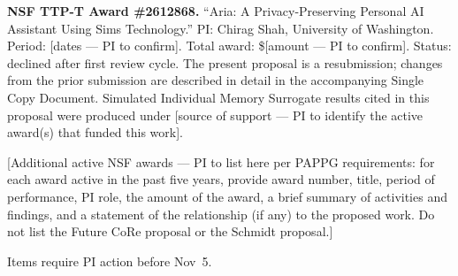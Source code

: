 \documentclass[11pt]{article}
\begin{document}
\textbf{NSF TTP-T Award \#2612868.} ``Aria: A Privacy-Preserving Personal AI Assistant Using Sims Technology.'' PI: Chirag Shah, University of Washington. Period: [dates --- PI to confirm]. Total award: \$[amount --- PI to confirm]. Status: declined after first review cycle. The present proposal is a resubmission; changes from the prior submission are described in detail in the accompanying Single Copy Document. Simulated Individual Memory Surrogate results cited in this proposal were produced under [source of support --- PI to identify the active award(s) that funded this work].

[Additional active NSF awards --- PI to list here per PAPPG requirements: for each award active in the past five years, provide award number, title, period of performance, PI role, the amount of the award, a brief summary of activities and findings, and a statement of the relationship (if any) to the proposed work. Do not list the Future CoRe proposal or the Schmidt proposal.]




\clearpage
{}

\noindent Items require PI action before Nov~5.
\end{document}
